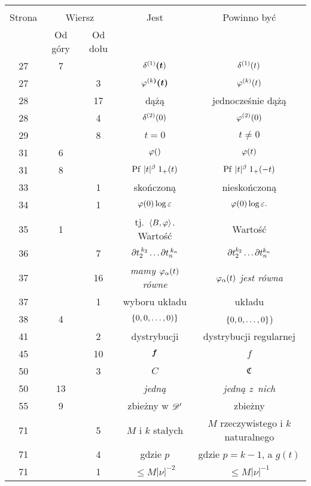 \documentclass[a4paper,11pt]{article}
\begin{document}
\newpage
{}
\begin{center}
  \begin{tabular}{|c|c|c|c|c|}
    \hline
    & \multicolumn{2}{c|}{} & & \\
    Strona & \multicolumn{2}{c|}{Wiersz} & Jest
                              & Powinno być \\ \cline{2-3}
    & Od góry & Od dołu & & \\
    \hline
    27 & 7 & & $\delta^{ ( 1 ) }\boldsymbol{ ( t } )$ & $\delta^{ ( 1 ) }( t )$ \\
    27 & & 3 & $\varphi^{ ( k \boldsymbol{ ) } }\boldsymbol{ ( t ) } $
           & $\varphi^{ ( k ) }( t )$ \\
    28 & & 17 & dążą & jednocześnie dążą \\
    28 & & 4 & $\delta^{ ( 2 ) }( 0 )$ & $\varphi^{ ( 2 ) }( 0 )$ \\
    29 & & 8 & $t = 0$ & $t \neq 0$ \\
    31 & 6 & & $\varphi( )$ & $\varphi( t )$ \\
    31 & 8 & & $\mathrm{Pf}\, \, | t |^{ \beta } \; 1_{ + }( t )$
           & $\mathrm{Pf}\, \, | t |^{ \beta } \; 1_{ + }( -t )$ \\
    33 & & 1 & skończoną & nieskończoną \\
    34 & & 1 & $\varphi( 0 ) \log\varepsilon$ & $\varphi( 0 ) \log\varepsilon.$ \\
    35 & 1 & & tj.~$\langle B, \varphi \rangle$. Wartość & Wartość \\
    36 & & 7 & $\partial t_{ 2 }^{ \: k_{ 2 } } \ldots \partial t_{ n }^{ \: k_{ n } }$
           & $\partial t_{ 2 }^{ k_{ 2 } } \ldots \partial t_{ n }^{ k_{ n } }$ \\
    37 & & 16 & \emph{mamy $\varphi_{ \alpha }( t )$ równe}
           & \emph{$\varphi_{ \alpha }( t )$ jest równa} \\
    37 & & 1 & wyboru układu & układu \\
    38 & 4 & & $\{ 0, 0, \ldots, 0 ) \}$ & $\{ 0, 0, \ldots, 0 \}$) \\
    41 & & 2 & dystrybucji & dystrybucji regularnej \\
    45 & & 10 & $\boldsymbol{f}$ & $f$ \\
    50 & & 3 & $C$ & $\mathfrak{C}$ \\
    50 & 13 & & \emph{jedną} & \emph{jedną z~nich} \\
    55 & 9 & & zbieżny w $\mathcal{D}'$ & zbieżny \\
    71 & & 5 & $M$ i $k$ stałych & $M$ rzeczywistego i $k$ naturalnego \\
    71 & & 4 & gdzie $p$ & gdzie $p = k - 1$, a $g( t )$\\
    71 & & 1 & $\leq M | \nu |^{ -2 }$ & $\leq M | \nu |^{ -1 }$\\
    \hline
  \end{tabular}
\end{center}
\end{document}
